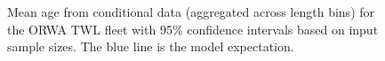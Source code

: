 \documentclass[
]{scrartcl}
\begin{document}
\begin{figure}


\caption{\label{fig-mean-age-4}Mean age from conditional data
(aggregated across length bins) for the ORWA TWL fleet with 95\%
confidence intervals based on input sample sizes. The blue line is the
model expectation.}

\end{figure}%
\end{document}
